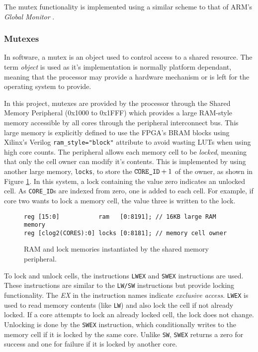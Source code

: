 The mutex functionality is implemented using a similar scheme to that of ARM's \textit{Global Monitor} \cite{armgmonitor}.

\subsubsection{Mutexes}
In software, a mutex is an object used to control access to a shared resource. The term \textit{object} is used as it's implementation is normally platform dependant, meaning that the processor may provide a hardware mechanism or is left for the operating system to provide.

In this project, mutexes are provided by the processor through the Shared Memory Peripheral (0x1000 to 0x1FFF) which provides a large RAM-style memory accessible by all cores through the peripheral interconnect bus. This large memory is explicitly defined to use the FPGA's BRAM blocks using Xilinx's Verilog \verb|ram_style="block"| attribute to avoid wasting LUTs when using high core counts. The peripheral allows each memory cell to be \textit{locked}, meaning that only the cell owner can modify it's contents. This is implemented by using another large memory, \verb|locks|, to store the $\verb|CORE_ID| + 1$ of the owner, as shown in Figure \ref{fig:lock}. In this system, a lock containing the value zero indicates an unlocked cell. As \verb|CORE_ID|s are indexed from zero, one is added to each cell. For example, if core two wants to lock a memory cell, the value three is written to the lock.

\begin{figure}[h]
\centering
\begin{verbatim}
reg [15:0]           ram   [0:8191]; // 16KB large RAM memory
reg [clog2(CORES):0] locks [0:8181]; // memory cell owner
\end{verbatim}
\caption{RAM and lock memories instantiated by the shared memory peripheral.}
\label{fig:lock}
\end{figure}

To lock and unlock cells, the instructions \verb|LWEX| and \verb|SWEX| instructions are used. These instructions are similar to the \verb|LW/SW| instructions but provide locking functionality. The \textit{EX} in the instruction names indicate \textit{exclusive access}. \verb|LWEX| is used to read memory contents  (like \verb|LW|) and also lock the cell if not already locked. If a core attempts to lock an already locked cell, the lock does not change. Unlocking is done by the \verb|SWEX| instruction, which conditionally writes to the memory cell if it is locked by the same core. Unlike \verb|SW|, \verb|SWEX| returns a zero for success and one for failure if it is locked by another core.

